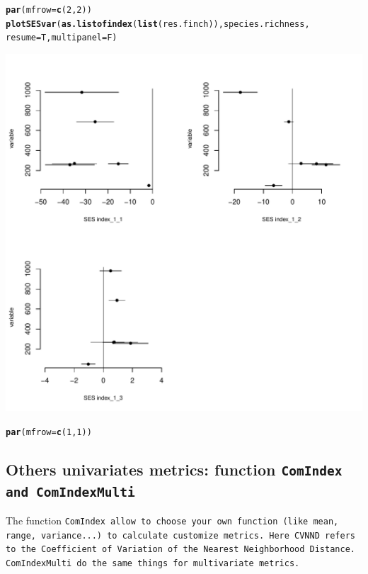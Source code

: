 \documentclass[12pt]{article}\usepackage[]{graphicx}\usepackage[]{color}
\makeatletter
\def\maxwidth{ %
  \ifdim\Gin@nat@width>\linewidth
    \linewidth
  \else
    \Gin@nat@width
  \fi
}
\newcommand{\hlnum}[1]{\textcolor[rgb]{0.686,0.059,0.569}{#1}}%
\newcommand{\hlstd}[1]{\textcolor[rgb]{0.345,0.345,0.345}{#1}}%
\newcommand{\hlkwc}[1]{\textcolor[rgb]{0.333,0.667,0.333}{#1}}%
\newcommand{\hlkwd}[1]{\textcolor[rgb]{0.737,0.353,0.396}{\textbf{#1}}}%
\newenvironment{kframe}{%
 \def\at@end@of@kframe{}%
 \ifinner\ifhmode%
  \def\at@end@of@kframe{\end{minipage}}%
  \begin{minipage}{\columnwidth}%
 \fi\fi%
 \def\FrameCommand##1{\hskip\@totalleftmargin \hskip-\fboxsep
 \colorbox{shadecolor}{##1}\hskip-\fboxsep
     \hskip-\linewidth \hskip-\@totalleftmargin \hskip\columnwidth}%
 \MakeFramed {\advance\hsize-\width
   \@totalleftmargin\z@ \linewidth\hsize
   \@setminipage}}%
 {\par\unskip\endMakeFramed%
 \at@end@of@kframe}
\newenvironment{knitrout}{}{} %
\makeatother
\begin{document}
\begin{knitrout}
\color{fgcolor}\begin{kframe}
\begin{alltt}
\hlkwd{par}\hlstd{(}\hlkwc{mfrow}\hlstd{=}\hlkwd{c}\hlstd{(}\hlnum{2}\hlstd{,}\hlnum{2}\hlstd{))}
\hlkwd{plotSESvar}\hlstd{(}\hlkwd{as.listofindex}\hlstd{(}\hlkwd{list}\hlstd{(res.finch)), species.richness,}
             \hlkwc{resume}\hlstd{=T,} \hlkwc{multipanel}\hlstd{=F)}
\end{alltt}
\end{kframe}
\includegraphics[width=\maxwidth]{figure/unnamed-chunk-35} 
\begin{kframe}\begin{alltt}
\hlkwd{par}\hlstd{(}\hlkwc{mfrow}\hlstd{=}\hlkwd{c}\hlstd{(}\hlnum{1}\hlstd{,}\hlnum{1}\hlstd{))}
\end{alltt}
\end{kframe}
\end{knitrout}


\newpage
\subsection{Others univariates metrics: function \tt{ComIndex} and \tt{ComIndexMulti}}

The function \tt{ComIndex} allow to choose your own function (like mean, range, variance...) to calculate customize metrics. Here CVNND refers to the Coefficient of Variation of the Nearest Neighborhood Distance. ComIndexMulti do the same things for multivariate metrics. 
\end{document}
